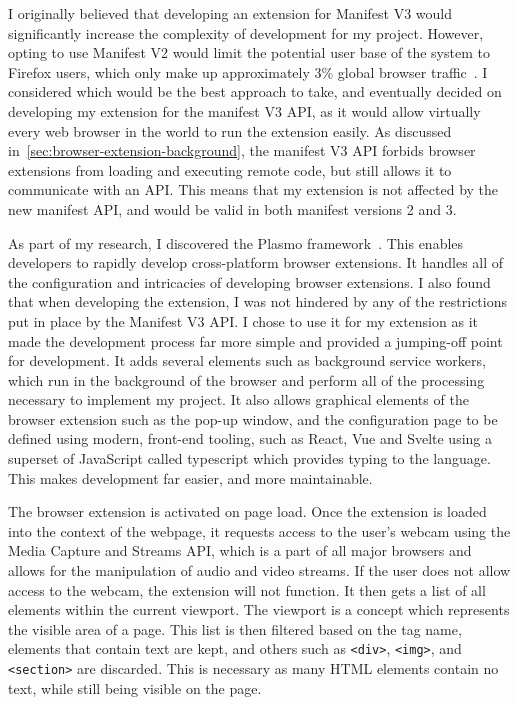 \documentclass{report}
\begin{document}
I originally believed that developing an extension for Manifest V3 would significantly increase the complexity of development for my project. However, opting to use Manifest V2 would limit the potential user base of the system to Firefox users, which only make up approximately 3\% global browser traffic~\cite{statcounter2024browser}. I considered which would be the best approach to take, and eventually decided on developing my extension for the manifest V3 API, as it would allow virtually every web browser in the world to run the extension easily. As discussed in~\autoref{sec:browser-extension-background}, the manifest V3 API forbids browser extensions from loading and executing remote code, but still allows it to communicate with an API. This means that my extension is not affected by the new manifest API, and would be valid in both manifest versions 2 and 3. 

As part of my research, I discovered the Plasmo framework~\cite{plasmo}. This enables developers to rapidly develop cross-platform browser extensions. It handles all of the configuration and intricacies of developing browser extensions. I also found that when developing the extension, I was not hindered by any of the restrictions put in place by the Manifest V3 API. I chose to use it for my extension as it made the development process far more simple and provided a jumping-off point for development. It adds several elements such as background service workers, which run in the background of the browser and perform all of the processing necessary to implement my project. It also allows graphical elements of the browser extension such as the pop-up window, and the configuration page to be defined using modern, front-end tooling, such as React, Vue and Svelte using a superset of JavaScript called typescript which provides typing to the language. This makes development far easier, and more maintainable.

The browser extension is activated on page load. Once the extension is loaded into the context of the webpage, it requests access to the user's webcam using the Media Capture and Streams API, which is a part of all major browsers and allows for the manipulation of audio and video streams. If the user does not allow access to the webcam, the extension will not function. It then gets a list of all elements within the current viewport. The viewport is a concept which represents the visible area of a page. This list is then filtered based on the tag name, elements that contain text are kept, and others such as \texttt{<div>}, \texttt{<img>}, and \texttt{<section>} are discarded. This is necessary as many HTML elements contain no text, while still being visible on the page. 
\end{document}
